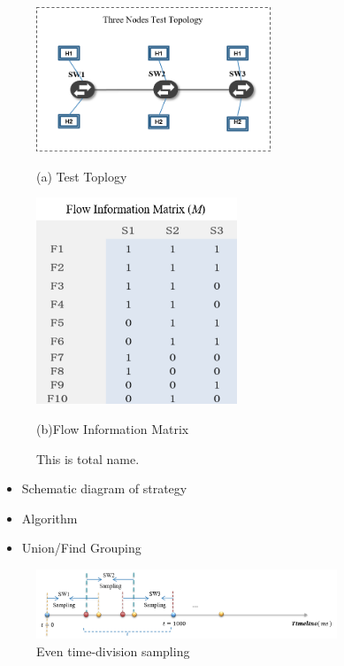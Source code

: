 \documentclass[conference,compsoc]{IEEEtran}
\begin{document}
\begin{figure}[!htp]
    \begin{minipage}[t]{0.5\linewidth}%
    \centering
    \includegraphics[width=7cm]{images/png_three_nodes_test_topo.png}
    \caption*{(a) Test Toplogy}%
    \label{fig:side:a}
    \end{minipage}
    \begin{minipage}[t]{0.5\linewidth}%
    \centering
    \includegraphics[width=6cm]{images/png_small_topo.png}
    \caption*{(b)Flow Information Matrix}
    \label{fig:side:b}
    \end{minipage}
    \caption{This is total name.}%

\end{figure}



\begin{itemize}
\item Schematic diagram of strategy
\item Algorithm
\item Union/Find Grouping

\end{itemize}


\begin{figure}[!hhhhhhhhhht]
\centering
\includegraphics[width=9cm]{images/samplingModel.png}
\caption{Even time-division sampling}
\label{aaa.png}
\end{figure}
 
\end{document}
